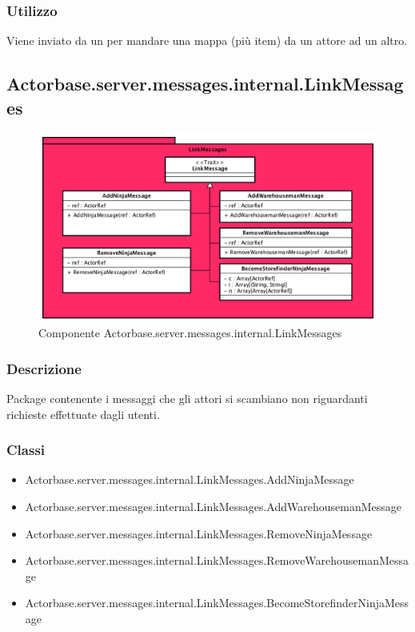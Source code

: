 \documentclass[a4paper]{article}
\begin{document}
			\subsubsection{Utilizzo}
				Viene inviato da un per mandare una mappa (più item) da un attore ad un altro.
				
				
		\subsection{Actorbase.server.messages.internal.LinkMessages}
						\begin{figure} [H]
				\centering
				\includegraphics[scale = 0.6]{ST/Server/LinkMessages.png}
				\caption{Componente Actorbase.server.messages.internal.LinkMessages}
			\end{figure}
			\subsubsection{Descrizione}
				Package contenente i messaggi che gli attori si scambiano non riguardanti richieste effettuate dagli utenti.
				
			\subsubsection{Classi}
				\begin{itemize}
					\item Actorbase.server.messages.internal.LinkMessages.AddNinjaMessage
					\item Actorbase.server.messages.internal.LinkMessages.AddWarehousemanMessage
					\item Actorbase.server.messages.internal.LinkMessages.RemoveNinjaMessage
					\item Actorbase.server.messages.internal.LinkMessages.RemoveWarehousemanMessage
					\item Actorbase.server.messages.internal.LinkMessages.BecomeStorefinderNinjaMessage
				\end{itemize}
			
\end{document}
